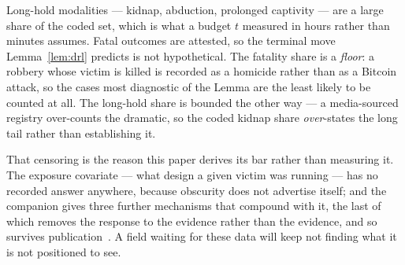 Long-hold modalities --- kidnap, abduction, prolonged captivity --- are a large
share of the coded set, which is what a budget $t$ measured in hours rather than
minutes assumes. Fatal outcomes are attested, so the terminal move
Lemma~\ref{lem:drl} predicts is not hypothetical. The fatality share is a
\emph{floor}: a robbery whose victim is killed is recorded as a homicide rather
than as a Bitcoin attack, so the cases most diagnostic of the Lemma are the least
likely to be counted at all. The long-hold share is bounded the other way --- a
media-sourced registry over-counts the dramatic, so the coded kidnap share
\emph{over}-states the long tail rather than establishing it.

That censoring is the reason this paper derives its bar rather than measuring
it. The exposure covariate --- what design a given victim was running --- has no
recorded answer anywhere, because obscurity does not advertise itself; and the
companion gives three further mechanisms that compound with it, the last of which
removes the response to the evidence rather than the evidence, and so survives
publication~\cite[\S6]{denial-spiral}. A field waiting for these data will keep
not finding what it is not positioned to see.
